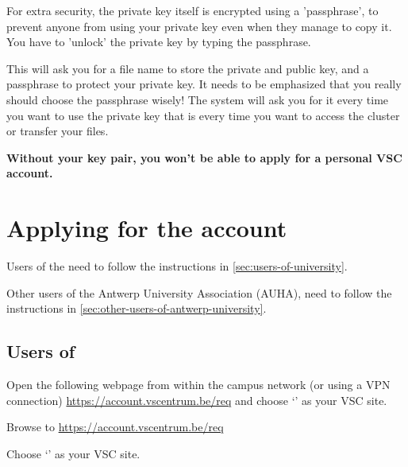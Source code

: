   For extra security, the private key itself is encrypted using a 'passphrase',
  to prevent anyone from using your private key even when they manage to copy
  it. You have to 'unlock' the private key by typing the passphrase.


  This will ask you for a file name to store the private and public key, and a
  passphrase to protect your private key. It needs to be emphasized that you
  really should choose the passphrase wisely! The system will ask you for it
  every time you want to use the private key that is every time you want to
  access the cluster or transfer your files.

  \textbf{Without your key pair, you won't be able to apply for a personal VSC account.}

\fi

\section{Applying for the account}
\label{sec:applying-for-the-account}

Users of the \university need to follow the instructions in \autoref{sec:users-of-university}.

\ifantwerpen
Other users of the Antwerp University Association (AUHA), need to follow the
instructions in \autoref{sec:other-users-of-antwerp-university}.
\fi

\subsection{Users of \university}
\label{sec:users-of-university}

Open the following webpage from within the \university campus network (or using a VPN
connection) \url{https://account.vscentrum.be/req} and choose `\sitename' as your VSC
site.

Browse to \url{https://account.vscentrum.be/req}

Choose `\university' as your VSC site.

